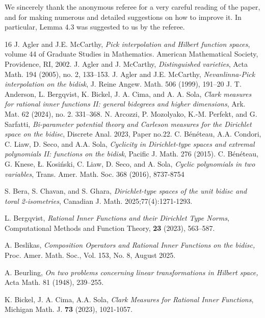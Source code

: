 \documentclass[11pt]{amsart}
\numberwithin{equation}{section}
\begin{document}
We sincerely thank the anonymous referee for a very careful reading of the paper, and for making numerous and detailed suggestions on how to improve it. In particular, Lemma 4.3 was suggested to us by the referee.
\begin{thebibliography}{16}
 J. Agler and J.E. McCarthy, \textit{Pick interpolation and Hilbert function spaces}, volume 44 of Graduate Studies in Mathematics.
American Mathematical Society, Providence, RI, 2002. 
 J. Agler and J. McCarthy, \textit{Distinguished varieties}, Acta Math. 194
(2005), no. 2, 133–153. 
 J. Agler and J.E. McCarthy, \textit{Nevanlinna-Pick interpolation on the bidisk}, J. Reine Angew. Math.
506 (1999), 191–20
J. T. Anderson, L. Bergqvist, K. Bickel, J. A. Cima, and A. A. Sola, \textit{Clark measures
for rational inner functions II: general bidegrees and higher dimensions}, Ark. Mat. 62 (2024), no. 2.
331–368.
N. Arcozzi, P. Mozolyako, K.-M. Perfekt, and G. Sarfatti, \textit{Bi-parameter potential theory and Carleson measures for the Dirichlet space on the bidisc}, Discrete Anal. 2023, Paper no.22.
  C. B\'en\'eteau, A.A. Condori, C. Liaw, D. Seco, and A.A. Sola, \textit{Cyclicity in Dirichlet-type spaces
and extremal polynomials II: functions on the bidisk}, Pacific J. Math. 276 (2015).
 C. B\'en\'eteau, G. Knese, \L . Kosi\'nski, C. Liaw, D. Seco, and A. Sola, \textit{Cyclic polynomials in two
variables}, Trans. Amer. Math. Soc. 368 (2016), 8737-8754

 S. Bera, S. Chavan, and S. Ghara, \textit{Dirichlet-type spaces of the unit bidisc and toral 2-isometries}, Canadian J. Math. 2025;77(4):1271-1293. 

 L. Bergqvist, \textit{Rational Inner Functions and their Dirichlet Type Norms}, Computational Methods and Function Theory, {\bf 23} (2023), 563–587.


 A. Beslikas, \textit{Composition Operators and Rational Inner Functions on the bidisc,} Proc. Amer. Math. Soc., Vol. 153, No. 8, August 2025.

 A. Beurling, \textit{On two problems concerning linear transformations in Hilbert space,} Acta Math. 81 (1948),
239–255.


 K. Bickel, J. A. Cima, A.A. Sola, \textit{Clark Measures for Rational Inner Functions},
Michigan Math. J. {\bf 73} (2023), 1021-1057. 


\end{thebibliography}
\end{document}
